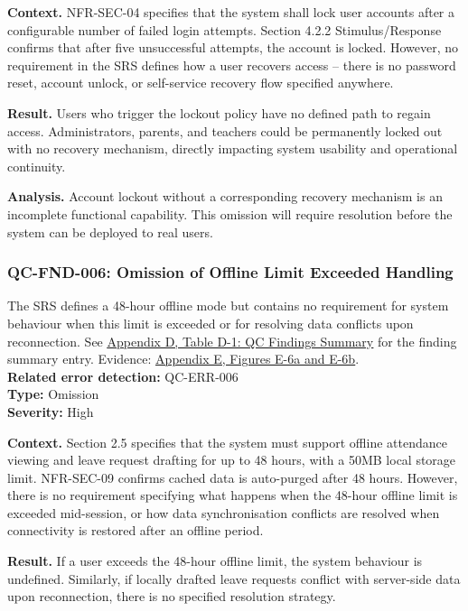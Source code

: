 \documentclass[11pt,a4paper]{article}
\let\orighyperref\hyperref
\renewcommand{\hyperref}[2][]{\orighyperref[#1]{\uline{#2}}}
\begin{document}
\textbf{Context.} NFR-SEC-04 specifies that the system shall lock user accounts after a configurable number of failed login attempts. Section 4.2.2 Stimulus/Response confirms that after five unsuccessful attempts, the account is locked. However, no requirement in the SRS defines how a user recovers access -- there is no password reset, account unlock, or self-service recovery flow specified anywhere.

\textbf{Result.} Users who trigger the lockout policy have no defined path to regain access. Administrators, parents, and teachers could be permanently locked out with no recovery mechanism, directly impacting system usability and operational continuity.

\textbf{Analysis.} Account lockout without a corresponding recovery mechanism is an incomplete functional capability. This omission will require resolution before the system can be deployed to real users.

\subsubsection*{QC-FND-006: Omission of Offline Limit Exceeded Handling}
The SRS defines a 48-hour offline mode but contains no requirement for system behaviour when this limit is exceeded or for resolving data conflicts upon reconnection. See \hyperref[tab:qc-findings-summary]{Appendix D, Table D-1: QC Findings Summary} for the finding summary entry. Evidence: \hyperref[fig:evidence-006]{Appendix E, Figures E-6a and E-6b}. \\
\textbf{Related error detection:} QC-ERR-006 \\
\textbf{Type:} Omission \\
\textbf{Severity:} High

\textbf{Context.} Section 2.5 specifies that the system must support offline attendance viewing and leave request drafting for up to 48 hours, with a 50MB local storage limit. NFR-SEC-09 confirms cached data is auto-purged after 48 hours. However, there is no requirement specifying what happens when the 48-hour offline limit is exceeded mid-session, or how data synchronisation conflicts are resolved when connectivity is restored after an offline period.

\textbf{Result.} If a user exceeds the 48-hour offline limit, the system behaviour is undefined. Similarly, if locally drafted leave requests conflict with server-side data upon reconnection, there is no specified resolution strategy.
\end{document}
